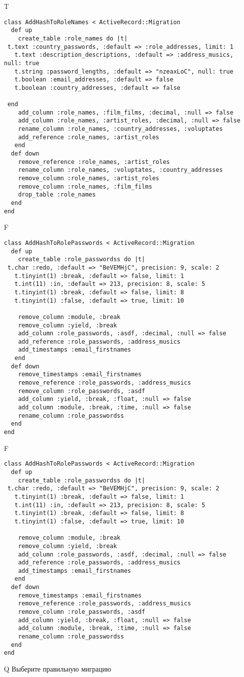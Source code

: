 T
\begin{verbatim}
class AddHashToRoleNames < ActiveRecord::Migration
  def up
    create_table :role_names do |t|
 t.text :country_passwords, :default => :role_addresses, limit: 1
   t.text :description_descriptions, :default => :address_musics, null: true
   t.string :password_lengths, :default => "nzeaxLoC", null: true
   t.boolean :email_addresses, :default => false
   t.boolean :country_addresses, :default => false

 end
    add_column :role_names, :film_films, :decimal, :null => false
    add_column :role_names, :artist_roles, :decimal, :null => false
    rename_column :role_names, :country_addresses, :voluptates
    add_reference :role_names, :artist_roles
   end
  def down
    remove_reference :role_names, :artist_roles
    rename_column :role_names, :voluptates, :country_addresses
    remove_column :role_names, :artist_roles
    remove_column :role_names, :film_films
    drop_table :role_names
  end
end
\end{verbatim}

F
\begin{verbatim}
class AddHashToRolePasswords < ActiveRecord::Migration
  def up
    create_table :role_passwordss do |t| 
 t.char :redo, :default => "BeVEMHjC", precision: 9, scale: 2
   t.tinyint(1) :break, :default => false, limit: 1
   t.int(11) :in, :default => 213, precision: 8, scale: 5
   t.tinyint(1) :break, :default => false, limit: 8
   t.tinyint(1) :false, :default => true, limit: 10

    remove_column :module, :break
    remove_column :yield, :break
    add_column :role_passwords, :asdf, :decimal, :null => false
    add_reference :role_passwords, :address_musics
    add_timestamps :email_firstnames
   end
  def down
    remove_timestamps :email_firstnames
    remove_reference :role_passwords, :address_musics
    remove_column :role_passwords, :asdf
    add_column :yield, :break, :float, :null => false
    add_column :module, :break, :time, :null => false
    rename_column :role_passwordss
  end
end
\end{verbatim}

F
\begin{verbatim}
class AddHashToRolePasswords < ActiveRecord::Migration
  def up
    create_table :role_passwordss do |t| 
 t.char :redo, :default => "BeVEMHjC", precision: 9, scale: 2
   t.tinyint(1) :break, :default => false, limit: 1
   t.int(11) :in, :default => 213, precision: 8, scale: 5
   t.tinyint(1) :break, :default => false, limit: 8
   t.tinyint(1) :false, :default => true, limit: 10

    remove_column :module, :break
    remove_column :yield, :break
    add_column :role_passwords, :asdf, :decimal, :null => false
    add_reference :role_passwords, :address_musics
    add_timestamps :email_firstnames
   end
  def down
    remove_timestamps :email_firstnames
    remove_reference :role_passwords, :address_musics
    remove_column :role_passwords, :asdf
    add_column :yield, :break, :float, :null => false
    add_column :module, :break, :time, :null => false
    rename_column :role_passwordss
  end
end
\end{verbatim}
Q
Выберите правильную миграцию

